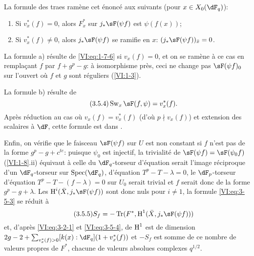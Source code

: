La formule des traes ramène cet énoncé aux suivants (pour 
$x\in X_0(\dF_q)$): 
\begin{enumerate}[\indent a)]
  \item Si $v_x^\ast(f)=0$, alors $F_x^\ast$ sur $j_\ast \sF(\psi f)$ est 
    $\psi(f(x))$; 
  \item Si $v_x^\ast(f)\ne 0$, alors $j_\ast \sF(\psi f)$ se ramifie en $x$: 
    $(j_\ast \sF(\psi f))_{\bar x}=0$. 
\end{enumerate}

La formule a) résulte de \eqref{VI:eq:1-7-6} si $v_x(f)=0$, et on se ramène 
à ce cas en remplaçant $f$ par $f+g^p-g$: à isomorphisme près, ceci ne 
change pas $\sF(\psi f)_0$ sur l'ouvert où $f$ et $g$ sont réguliers 
(\ref{VI:1-3}). 

La formule b) résulte de 
\begin{equation*}\tag{3.5.4}\label{VI:eq:3-5-4}
  \swan_x \sF(f,\psi) = v_x^\ast(f) \text{.} 
\end{equation*}
Après réduction au cas où $v_x(f)=v_x^\ast(f)$ (d'où $p\nmid v_x(f)$) 
et extension des scalaires à $\dF$, cette formule est dans 
\cite[4.4]{se61}. 

Enfin, on vérifie que le faisceau $\sF(\psi f)$ sur $U$ est non constant si 
$f$ n'est pas de la forme $g^p-g+c^{t e}$: puisque $\psi_0$ est injectif, la 
trivialité de $\sF(\psi f)=\sF(\psi_0 f)$ (\ref{VI:1-8}.ii) équivaut à 
celle du $\dF_q$-torseur d'équation serait l'image réciproque d'un 
$\dF_q$-torseur sur $\spec(\dF_q)$, d'équation $T^p-T-\lambda=0$, le 
$\dF_p$-torseur d'équation $T^p-T-(f-\lambda)=0$ sur $U_0$ serait trivial 
et $f$ serait donc de la forme $g^p-g+\lambda$. Les 
$\h^i(\bar X,j_\ast \sF(\psi f))$ sont donc nuls pour $i\ne 1$, la formule 
\eqref{VI:eq:3-5-3} se réduit à 
\begin{equation*}\tag{3.5.5}\label{VI:eq:3-5-5}
  S_f = -\tr(F^\ast,\h^1(\bar X,j_\ast \sF(\psi f))) 
\end{equation*}
et, d'après \eqref{VI:eq:3-2-1} et \eqref{VI:eq:3-5-4}, de $\operatorname{H}^1$ est de 
dimension $2 g-2+\sum_{v_x^\ast(f)>0} [k(x):\dF_q](1+v_x^\ast(f))$ et $-S_f$ 
est somme de ce nombre de valeurs propres de $F^\ast$, chacune de valeurs 
absolues complexes $q^{1/2}$. 





\subsection{}\label{VI:3-6}


